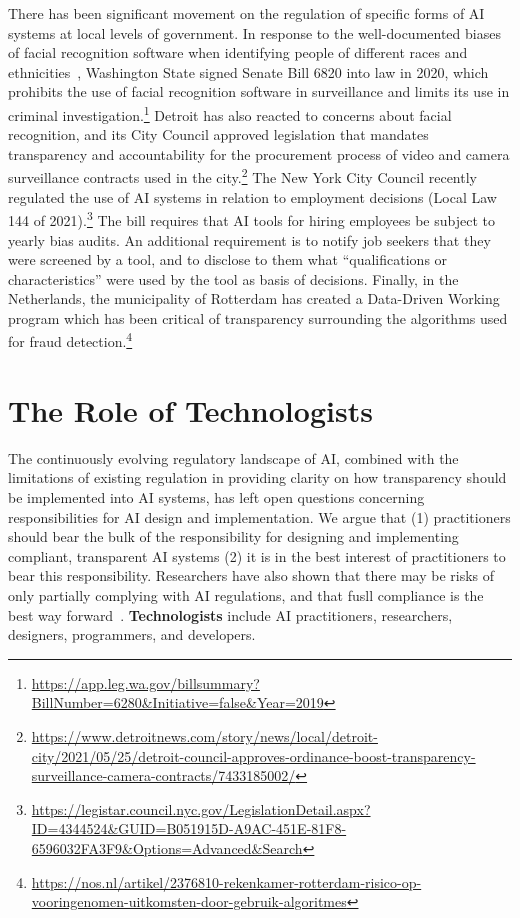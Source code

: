 \documentclass[sigconf, nonacm]{acmart}
\begin{document}
There has been significant movement on the regulation of specific forms of AI systems at local levels of government. In response to the well-documented biases of facial recognition software when identifying people of different races and ethnicities~\cite{DBLP:conf/fat/BuolamwiniG18}, Washington State signed Senate Bill 6820 into law in 2020, which prohibits the use of facial recognition software in surveillance and limits its use in criminal investigation.\footnote{\url{https://app.leg.wa.gov/billsummary?BillNumber=6280&Initiative=false&Year=2019}} Detroit has also reacted to concerns about facial recognition, and its City Council approved legislation that mandates transparency and accountability for the procurement process of video and camera surveillance contracts used in the city.\footnote{\url{https://www.detroitnews.com/story/news/local/detroit-city/2021/05/25/detroit-council-approves-ordinance-boost-transparency-surveillance-camera-contracts/7433185002/}} The New York City Council recently regulated the use of AI systems in relation to employment decisions (Local Law 144 of 2021).\footnote{\url{https://legistar.council.nyc.gov/LegislationDetail.aspx?ID=4344524&GUID=B051915D-A9AC-451E-81F8-6596032FA3F9&Options=Advanced&Search}} The bill requires that AI tools for hiring employees be subject to yearly bias audits. An additional requirement is to notify job seekers that they were screened by a tool, and to disclose to them what ``qualifications or characteristics'' were used by the tool as basis of decisions. Finally, in the Netherlands, the municipality of Rotterdam has created a Data-Driven Working program which has been critical of transparency surrounding the algorithms used for fraud detection.\footnote{\url{https://nos.nl/artikel/2376810-rekenkamer-rotterdam-risico-op-vooringenomen-uitkomsten-door-gebruik-algoritmes}}



\section{The Role of Technologists}

The continuously evolving regulatory landscape of AI, combined with the limitations of existing regulation in providing clarity on how transparency should be implemented into AI systems, has left open questions concerning responsibilities for AI design and implementation. We argue that (1) practitioners should bear the bulk of the responsibility for designing and implementing compliant, transparent AI systems (2) it is in the best interest of practitioners to bear this responsibility. Researchers have also shown that there may be risks of only partially complying with AI regulations, and that fusll compliance is the best way forward~\cite{dai2021fair}. {\bf Technologists} include AI practitioners, researchers, designers, programmers, and developers.
\end{document}
